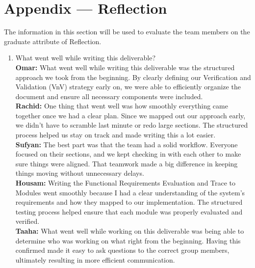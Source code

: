 \documentclass[12pt, titlepage]{article}
\begin{document}


\newpage{}
\section*{Appendix --- Reflection}

The information in this section will be used to evaluate the team members on the
graduate attribute of Reflection.



\begin{enumerate}
  \item What went well while writing this deliverable? \\
  \textbf{Omar:} What went well while writing this deliverable was the structured approach we took from the beginning. By clearly defining our Verification and Validation (VnV) strategy early on, we were able to efficiently organize the document and ensure all necessary components were included. \\
  \textbf{Rachid:} One thing that went well was how smoothly everything came together once we had a clear plan. Since we mapped out our approach early, we didn't have to scramble last minute or redo large sections. The structured process helped us stay on track and made writing this a lot easier. \\
  \textbf{Sufyan:} The best part was that the team had a solid workflow. Everyone focused on their sections, and we kept checking in with each other to make sure things were aligned. That teamwork made a big difference in keeping things moving without unnecessary delays. \\
  \textbf{Housam:} Writing the Functional Requirements Evaluation and Trace to Modules went smoothly because I had a clear understanding of the system’s requirements and how they mapped to our implementation. The structured testing process helped ensure that each module was properly evaluated and verified.\\
  \textbf{Taaha:} What went well while working on this deliverable was being able to determine who was working on what right from the beginning. Having this confirmed made it easy to ask questions to the correct group members, ultimately resulting in more efficient communication.
  


\end{enumerate}
\end{document}
